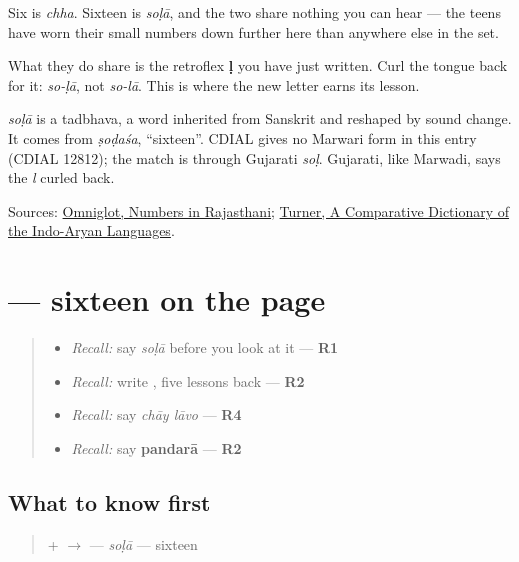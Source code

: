 Six is \emph{chha}. Sixteen is \emph{soḷā}, and the two share nothing you can hear — the teens have worn their small numbers down further here than anywhere else in the set.

What they do share is the retroflex \textbf{ḷ} you have just written. Curl the tongue back for it: \emph{so-ḷā}, not \emph{so-lā}. This is where the new letter earns its lesson.

\begin{cousinweb}
\emph{soḷā} is a tadbhava, a word inherited from Sanskrit and reshaped by sound change. It comes from \emph{ṣoḍaśa}, \textquotedblleft{}sixteen\textquotedblright{}. CDIAL gives no Marwari form in this entry (CDIAL 12812); the match is through Gujarati \emph{soḷ}. Gujarati, like Marwadi, says the \emph{l} curled back.
\end{cousinweb}

\begin{tcolorbox}[breakable,colback=teal!4,colframe=teal!35!black,title={Before you move on}]
Sources: \href{https://www.omniglot.com/language/numbers/rajasthani.htm}{Omniglot, Numbers in Rajasthani}; \href{https://dsal.uchicago.edu/dictionaries/soas/}{Turner, A Comparative Dictionary of the Indo-Aryan Languages}.
\end{tcolorbox}
\section[\texorpdfstring{\mw{सोळा} (soḷā)}{सोळा (soḷā)}]{ — sixteen on the page}

\label{lesson:MW-C38-sola}



\begin{quote}
\begin{itemize}
\raggedright
  \item \emph{Recall:} say \emph{soḷā} before you look at it — \textbf{R1}
  \item \emph{Recall:} write \textbf{}, five lessons back — \textbf{R2}
  \item \emph{Recall:} say \emph{chāy lāvo} — \textbf{R4}
  \item \emph{Recall:} say \textbf{pandarā} — \textbf{R2}
\end{itemize}
\end{quote}

\subsection*{What to know first}
\begin{quote}
\textbf{} + \textbf{} $\to$ \textbf{} — \emph{soḷā} — sixteen
\end{quote}

